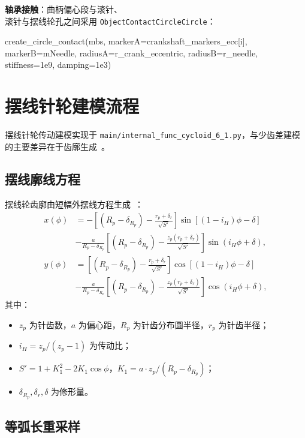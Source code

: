 \documentclass[12pt]{ctexart}
\begin{document}
\textbf{轴承接触}：曲柄偏心段与滚针、\\ 滚针与摆线轮孔之间采用 \texttt{ObjectContactCircleCircle}：

\begin{pythoncode}[圆-圆接触创建]
create_circle_contact(mbs,
    markerA=crankshaft_markers_ecc[i],
    markerB=mNeedle,
    radiusA=r_crank_eccentric,
    radiusB=r_needle,
    stiffness=1e9, damping=1e3)
\end{pythoncode}

\section{摆线针轮建模流程}

摆线针轮传动建模实现于 \texttt{main/internal\_func\_cycloid\_6\_1.py}，与少齿差建模的主要差异在于齿廓生成~\cite{cycloidmodel}。

\subsection{摆线廓线方程}

摆线轮齿廓由短幅外摆线方程生成~\cite{litvin}：
\begin{align}
x(\phi) &= -\left[(R_p - \delta_{R_p}) - \frac{r_p + \delta_r}{\sqrt{S'}}\right]\sin\left[(1-i_H)\phi - \delta\right] \nonumber \\ &
- \frac{a}{R_p - \delta_{R_p}}\left[(R_p - \delta_{R_p}) - \frac{z_p(r_p + \delta_r)}{\sqrt{S'}}\right]\sin(i_H\phi + \delta), \\ y(\phi) &= \left[(R_p - \delta_{R_p}) - \frac{r_p + \delta_r}{\sqrt{S'}}\right]\cos\left[(1-i_H)\phi - \delta\right] \nonumber \\ &
- \frac{a}{R_p - \delta_{R_p}}\left[(R_p - \delta_{R_p}) - \frac{z_p(r_p + \delta_r)}{\sqrt{S'}}\right]\cos(i_H\phi + \delta),
\end{align}
其中：
\begin{itemize}
  \item $z_p$ 为针齿数，$a$ 为偏心距，$R_p$ 为针齿分布圆半径，$r_p$ 为针齿半径；
  \item $i_H = z_p/(z_p - 1)$ 为传动比；
  \item $S' = 1 + K_1^2 - 2K_1\cos\phi$，$K_1 = a \cdot z_p / (R_p - \delta_{R_p})$；
  \item $\delta_{R_p}, \delta_r, \delta$ 为修形量。
\end{itemize}

\subsection{等弧长重采样}
\end{document}
